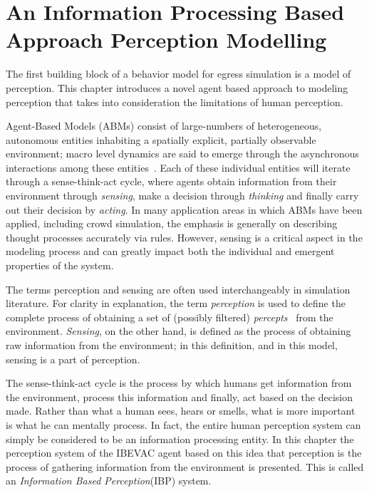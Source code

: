 
\chapter{An Information Processing Based Approach Perception Modelling}
\label{chapter:IBP}

The first building block of a behavior model for egress simulation is a model of perception. This chapter introduces a novel agent based approach to modeling perception that takes into consideration the limitations of human perception.

Agent-Based Models (ABMs) consist of large-numbers of heterogeneous, autonomous entities inhabiting a spatially explicit, partially observable environment; macro level dynamics are said to emerge through the asynchronous interactions among these entities~\cite{Bonabeau:2002um,Epstein:1999vn}. Each of these individual entities will iterate through a sense-think-act cycle, where agents obtain information from their environment through {\em sensing}, make a decision through {\em thinking} and finally carry out their decision by {\em acting}. In many application areas in which ABMs have been applied, including crowd simulation, the emphasis is generally on describing thought processes accurately via rules. However, sensing is a critical aspect in the modeling process and can greatly impact both the individual and emergent properties of the system.

The terms perception and sensing are often used interchangeably in simulation literature. For clarity in explanation, the term {\em perception} is used to define the complete process of obtaining a set of (possibly filtered) \emph{percepts}~\cite{Russel:1995vi} from the environment. {\em Sensing}, on the other hand, is defined as the process of obtaining raw information from the environment; in this definition, and in this model, sensing is a part of perception.

The sense-think-act cycle is the process by which humans get information from the environment, process this information and finally, act based on the decision made. Rather than what a human sees, hears or smells, what is more important is what he can mentally process. In fact, the entire human perception system can simply be considered to be an information processing entity. In this chapter the perception system of the IBEVAC agent based on this idea that perception is the process of gathering information from the environment is presented. This is called an \emph{Information Based Perception}(IBP) system.

